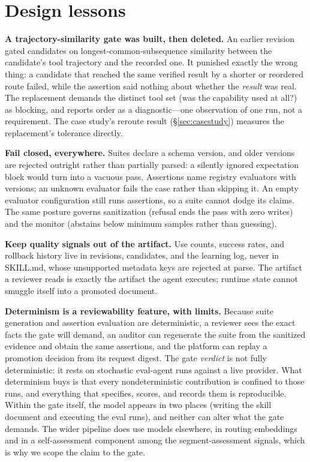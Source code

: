 \documentclass{article}
\begin{document}
\section{Design lessons}
\label{sec:lessons}

\textbf{A trajectory-similarity gate was built, then deleted.} An earlier revision gated candidates on longest-common-subsequence similarity between the candidate's tool trajectory and the recorded one. It punished exactly the wrong thing: a candidate that reached the same verified result by a shorter or reordered route failed, while the assertion said nothing about whether the \emph{result} was real. The replacement demands the distinct tool set (was the capability used at all?) as blocking, and reports order as a diagnostic---one observation of one run, not a requirement. The case study's reroute result (\S\ref{sec:casestudy}) measures the replacement's tolerance directly.

\textbf{Fail closed, everywhere.} Suites declare a schema version, and older versions are rejected outright rather than partially parsed: a silently ignored expectation block would turn into a vacuous pass. Assertions name registry evaluators with versions; an unknown evaluator fails the case rather than skipping it. An empty evaluator configuration still runs assertions, so a suite cannot dodge its claims. The same posture governs sanitization (refusal ends the pass with zero writes) and the monitor (abstains below minimum samples rather than guessing).

\textbf{Keep quality signals out of the artifact.} Use counts, success rates, and rollback history live in revisions, candidates, and the learning log, never in SKILL.md, whose unsupported metadata keys are rejected at parse. The artifact a reviewer reads is exactly the artifact the agent executes; runtime state cannot smuggle itself into a promoted document.

\textbf{Determinism is a reviewability feature, with limits.} Because suite generation and assertion evaluation are deterministic, a reviewer sees the exact facts the gate will demand, an auditor can regenerate the suite from the sanitized evidence and obtain the same assertions, and the platform can replay a promotion decision from its request digest. The gate \emph{verdict} is not fully deterministic: it rests on stochastic eval-agent runs against a live provider. What determinism buys is that every nondeterministic contribution is confined to those runs, and everything that specifies, scores, and records them is reproducible. Within the gate itself, the model appears in two places (writing the skill document and executing the eval runs), and neither can alter what the gate demands. The wider pipeline does use models elsewhere, in routing embeddings and in a self-assessment component among the segment-assessment signals, which is why we scope the claim to the gate.
\end{document}
